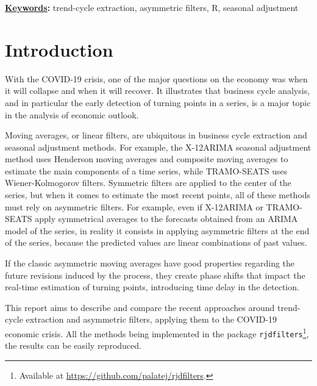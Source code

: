 \documentclass[
  12pt,
  ,
  a4paper]{article}
\title{
\vspace{-5ex}
\thetitle
\vspace{-2ex}
}
\author{
\theauthors
\vspace{-5ex}
}
\date{}
\date{}
\def\thekeywords{%
trend-cycle extraction, asymmetric filters, R, seasonal adjustment%
}
\begin{document}
\cfoot{\thepage} %
\sectionfont{\large\textsc}


\maketitle

{\fontsize{10pt}{12.0pt}\selectfont \textbf{\uline{Keywords}:} \thekeywords\par}\par


\hypertarget{introduction}{%
\section{Introduction}\label{introduction}}

With the COVID-19 crisis, one of the major questions on the economy was when it will collapse and when it will recover.
It illustrates that business cycle analysis, and in particular the early detection of turning points in a series, is a major topic in the analysis of economic outlook.

Moving averages, or linear filters, are ubiquitous in business cycle extraction and seasonal adjustment methods.
For example, the X-12ARIMA seasonal adjustment method uses Henderson moving averages and composite moving averages to estimate the main components of a time series, while TRAMO-SEATS uses Wiener-Kolmogorov filters.
Symmetric filters are applied to the center of the series, but when it comes to estimate the most recent points, all of these methods must rely on asymmetric filters.
For example, even if X-12ARIMA or TRAMO-SEATS apply symmetrical averages to the forecasts obtained from an ARIMA model of the series, in reality it consists in applying asymmetric filters at the end of the series, because the predicted values are linear combinations of past values.

If the classic asymmetric moving averages have good properties regarding the future revisions induced by the process, they create phase shifts that impact the real-time estimation of turning points, introducing time delay in the detection.

This report aims to describe and compare the recent approaches around trend-cycle extraction and asymmetric filters, applying them to the COVID-19 economic crisis.
All the methods being implemented in the  package \texttt{rjdfilters}\footnote{Available at \url{https://github.com/palatej/rjdfilters}.}, the results can be easily reproduced.
\end{document}
